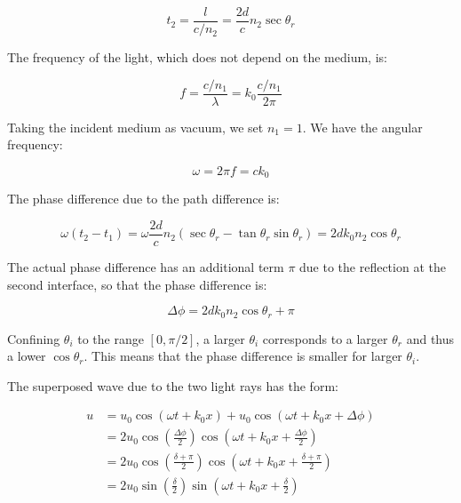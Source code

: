 \documentclass[12pt]{article}
\begin{document}
\begin{equation}
    t_{2} = \frac{l}{c/n_{2}} = \frac{2d}{c} n_{2} \sec{\theta_{r}}
\end{equation}

The frequency of the light, which does not depend on the medium, is:

\begin{equation}
    f = \frac{c/n_{1}}{\lambda} = k_{0} \frac{c/n_{1}}{2\pi}
\end{equation}

Taking the incident medium as vacuum, we set $n_{1} = 1$. We have the angular frequency:

\begin{equation}
    \omega = 2\pi f = ck_{0}
\end{equation}

The phase difference due to the path difference is:

\begin{equation}
    \omega(t_{2} - t_{1}) = \omega \frac{2d}{c} n_{2} \left( \sec{\theta_{r}} - \tan{\theta_{r}} \sin{\theta_{r}} \right) = 2d k_{0} n_{2} \cos{\theta_{r}}
\end{equation}

The actual phase difference has an additional term $\pi$ due to the reflection at the second interface, so that the phase difference is:

\begin{equation}
    \Delta \phi = 2d k_{0} n_{2} \cos{\theta_{r}} + \pi
\end{equation}

Confining $\theta_{i}$ to the range $[0, \pi/2]$, a larger $\theta_{i}$ corresponds to a larger $\theta_{r}$ and thus a lower $\cos{\theta_{r}}$. This means that the phase difference is smaller for larger $\theta_{i}$.

The superposed wave due to the two light rays has the form:

\begin{equation}
    \begin{split}
        u &= u_{0} \cos{(\omega t + k_{0}x)} + u_{0} \cos{(\omega t + k_{0}x + \Delta \phi)} \\
        &= 2u_{0} \cos{\left( \frac{\Delta \phi}{2} \right)} \cos{\left( \omega t + k_{0}x + \frac{\Delta \phi}{2} \right)} \\
        &= 2u_{0} \cos{\left( \frac{\delta + \pi}{2} \right)} \cos{\left( \omega t + k_{0}x + \frac{\delta + \pi}{2} \right)} \\
        &= 2u_{0} \sin{\left( \frac{\delta}{2} \right)} \sin{\left( \omega t + k_{0}x + \frac{\delta}{2} \right)}
    \end{split}
\end{equation}
\end{document}
